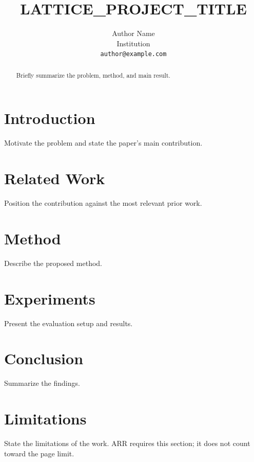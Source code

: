\documentclass[11pt]{article}
\title{LATTICE_PROJECT_TITLE}
\author{Author Name \\
  Institution \\
  \texttt{author@example.com}}
\begin{document}
\maketitle

\begin{abstract}
Briefly summarize the problem, method, and main result.
\end{abstract}

\section{Introduction}
Motivate the problem and state the paper's main contribution.

\section{Related Work}
Position the contribution against the most relevant prior work.

\section{Method}
Describe the proposed method.

\section{Experiments}
Present the evaluation setup and results.

\section{Conclusion}
Summarize the findings.

\section*{Limitations}
State the limitations of the work. ARR requires this section; it does not
count toward the page limit.

% 
\end{document}
